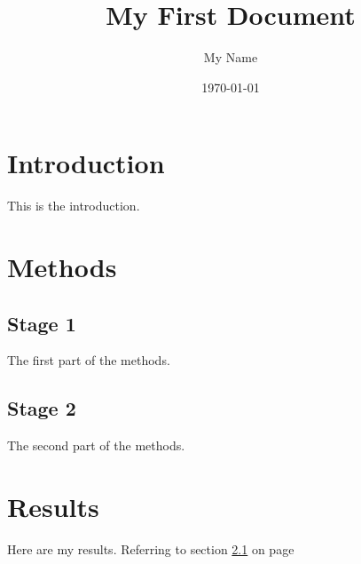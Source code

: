 \documentclass[a4paper, 12pt]{article}
\begin{document}
  \title{My First Document}
  \author{My Name}
  \date{\today}
  \maketitle
  \thispagestyle{empty}

  \section{Introduction}
  This is the introduction.

  \section{Methods}

  \subsection{Stage 1}
  \label{sec1} The first part of the methods.

  \subsection{Stage 2}
  The second part of the methods.

  \section{Results}
  Here are my results. Referring to section \ref{sec1} on page \pageref{sec1}
\end{document}
